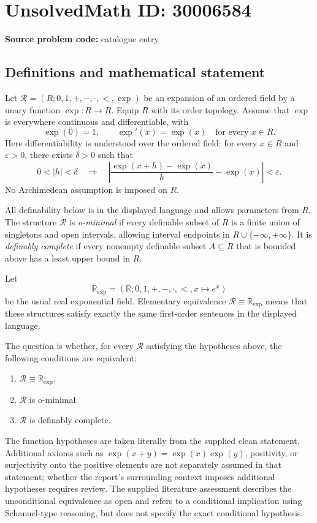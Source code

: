 \documentclass[11pt]{article}
\begin{document}
\section*{UnsolvedMath ID: 30006584}
\textbf{Source problem code:} catalogue entry
\subsection{Definitions and mathematical statement}
Let \(\mathcal R=(R;0,1,+,-,\cdot,<,\exp)\) be an expansion of an ordered field by a unary function \(\exp:R\to R\). Equip \(R\) with its order topology. Assume that \(\exp\) is everywhere continuous and differentiable, with
\[
\exp(0)=1,\qquad \exp'(x)=\exp(x)\quad\text{for every }x\in R.
\]
Here differentiability is understood over the ordered field: for every \(x\in R\) and \(\varepsilon>0\), there exists \(\delta>0\) such that
\[
0<|h|<\delta\quad\Longrightarrow\quad
\left|\frac{\exp(x+h)-\exp(x)}{h}-\exp(x)\right|<\varepsilon.
\]
No Archimedean assumption is imposed on \(R\).

All definability below is in the displayed language and allows parameters from \(R\). The structure \(\mathcal R\) is \emph{o-minimal} if every definable subset of \(R\) is a finite union of singletons and open intervals, allowing interval endpoints in \(R\cup\{-\infty,+\infty\}\). It is \emph{definably complete} if every nonempty definable subset \(A\subseteq R\) that is bounded above has a least upper bound in \(R\).

Let
\[
\mathbb R_{\exp}=(\mathbb R;0,1,+,-,\cdot,<,x\mapsto e^x)
\]
be the usual real exponential field. Elementary equivalence \(\mathcal R\equiv\mathbb R_{\exp}\) means that these structures satisfy exactly the same first-order sentences in the displayed language.

The question is whether, for every \(\mathcal R\) satisfying the hypotheses above, the following conditions are equivalent:
\begin{enumerate}
\item \(\mathcal R\equiv\mathbb R_{\exp}\).
\item \(\mathcal R\) is o-minimal.
\item \(\mathcal R\) is definably complete.
\end{enumerate}
The function hypotheses are taken literally from the supplied clean statement. Additional axioms such as \(\exp(x+y)=\exp(x)\exp(y)\), positivity, or surjectivity onto the positive elements are not separately assumed in that statement; whether the report's surrounding context imposes additional hypotheses requires review. The supplied literature assessment describes the unconditional equivalence as open and refers to a conditional implication using Schanuel-type reasoning, but does not specify the exact conditional hypothesis.
\end{document}

